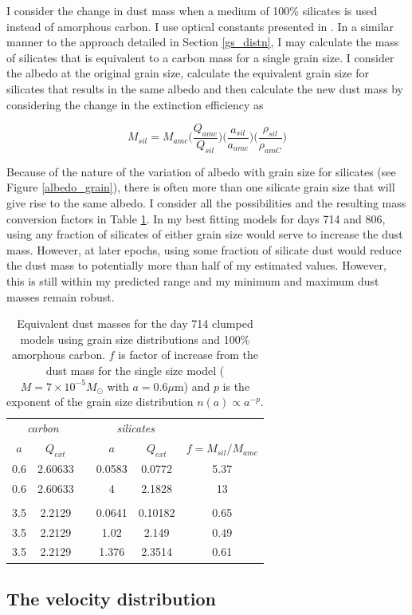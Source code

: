 I consider the change in dust mass when a medium of 100\% silicates is used instead of amorphous carbon.  I use optical constants presented in \cite{Draine1984}.  In a similar manner to the approach detailed in Section \ref{gs_distn}, I may calculate the mass of silicates that is equivalent to a carbon mass for a single grain size.  I consider the albedo at the original grain size, calculate the equivalent grain size for silicates that results in the same albedo and then calculate the new dust mass by considering the change in the extinction efficiency as

\begin{equation}
M_{sil} = M_{amc} \Big( \frac{Q_{amc}}{Q_{sil}} \Big) \Big(\frac{a_{sil}}{a_{amc}}\Big) \Big(\frac{\rho_{sil}}{\rho_{amC}}\Big)
\end{equation}

Because of the nature of the variation of albedo with grain size for silicates (see Figure \ref{albedo_grain}), there is often more than one silicate grain size that will give rise to the same albedo.  I consider all the possibilities and the resulting mass conversion factors in Table \ref{tb_sil}.  In my best fitting models for days 714 and 806, using any fraction of silicates of either grain size would serve to increase the dust mass.  However, at later epochs, using some fraction of silicate dust would reduce the dust mass to potentially more than half of my estimated values. However, this is still within my predicted range and my minimum and maximum dust masses remain robust.

\begin{table}
	\caption{Equivalent dust masses for the day 714 clumped models using grain size distributions and 100\% amorphous carbon. $f$ is factor of increase from the dust mass for the single size model ($M=7 \times 10^{-5} M_{\odot}$ with $a=0.6 \mu$m) and $p$ is the exponent of the grain size distribution $n(a) \propto a^{-p}$.}
	\label{tb_sil}
	\begin{center}
  	\begin{tabular}{@{} cccccc @{}}
    	\hline
	\multicolumn{2}{c}{\textit{carbon}} && \multicolumn{2}{c}{\textit{silicates}} & \\
$a$ & $Q_{ext}$ & &$a$& $Q_{ext}$ & $f=M_{sil}/M_{amc}$ \\
\hline
0.6 & 2.60633 & &0.0583 & 0.0772 & 5.37 \\
0.6 & 2.60633 & &4 & 2.1828 & 13 \\
 \\
3.5 & 2.2129 & &0.0641 & 0.10182 & 0.65 \\
3.5 & 2.2129 & &1.02 & 2.149 & 0.49 \\
3.5 & 2.2129 & &1.376 & 2.3514 & 0.61 \\


    \hline
  \end{tabular}
  \end{center}
\end{table}

\subsection{The velocity distribution}
\label{scn:vel_prof}








